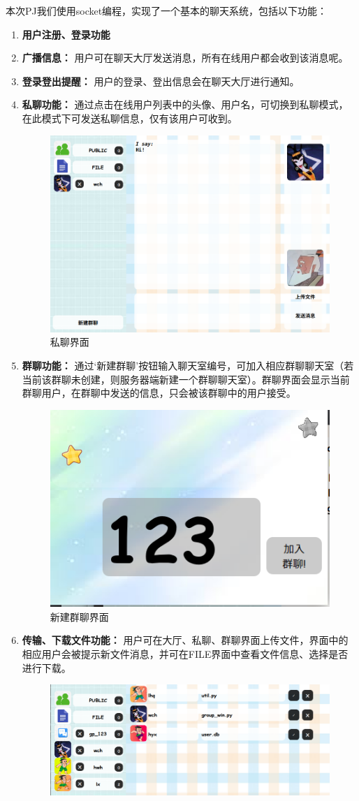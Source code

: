 \documentclass[12pt]{article} %
\begin{document}
\begin{sloppypar}
本次PJ我们使用socket编程，实现了一个基本的聊天系统，包括以下功能：
\begin{enumerate}
	\item {\bf 用户注册、登录功能}
	\item {\bf 广播信息：} 用户可在聊天大厅发送消息，所有在线用户都会收到该消息呢。 
	\item {\bf 登录登出提醒：} 用户的登录、登出信息会在聊天大厅进行通知。
	\item {\bf 私聊功能：} 通过点击在线用户列表中的头像、用户名，可切换到私聊模式，在此模式下可发送私聊信息，仅有该用户可收到。
	\begin{figure}[htbp]
		\centering
		\includegraphics[width=0.7\linewidth]{figure/private.png}
		\caption{私聊界面}
	\end{figure}
	\item {\bf 群聊功能：} 通过‘新建群聊’按钮输入聊天室编号，可加入相应群聊聊天室（若当前该群聊未创建，则服务器端新建一个群聊聊天室）。群聊界面会显示当前群聊用户，在群聊中发送的信息，只会被该群聊中的用户接受。
	\begin{figure}[htbp]
		\centering
		\includegraphics[width=0.4\linewidth]{figure/group.png}
		\caption{新建群聊界面}
	\end{figure}
	\item {\bf 传输、下载文件功能：} 用户可在大厅、私聊、群聊界面上传文件，界面中的相应用户会被提示新文件消息，并可在FILE界面中查看文件信息、选择是否进行下载。
	\begin{figure}[htbp]
		\centering
		\includegraphics[width=0.8\linewidth]{figure/file.png}

\end{figure}
\end{enumerate}
\end{sloppypar}
\end{document}
